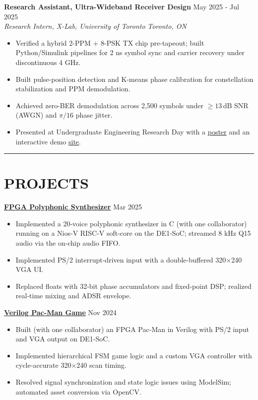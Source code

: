 \documentclass[letterpaper,10pt]{article}
\begin{document}
\vspace{0.2cm}
\noindent
\textbf{Research Assistant, Ultra-Wideband Receiver Design} \hfill May 2025 - Jul 2025\\
\textit{Research Intern, X-Lab, University of Toronto} \hfill \textit{Toronto, ON}
\begin{itemize}[leftmargin=0.2in]
    \item Verified a hybrid 2-PPM + 8-PSK TX chip pre-tapeout; built Python/Simulink pipelines for 2 ns symbol sync and carrier recovery under discontinuous 4 GHz.
	\item Built pulse-position detection and K-means phase calibration for constellation stabilization and PPM demodulation.
    \item Achieved zero-BER demodulation across 2,500 symbols under $\geq 13\,\mathrm{dB}$ SNR (AWGN) and $\pi/16$ phase jitter.
    \item Presented at Undergraduate Engineering Research Day with a \href{https://docs.google.com/presentation/d/1h4lmc_HQLzNvtGE4oE1jedOlNVZjL3iztEyGKnC-ico/edit?usp=sharing}{\uline{poster}} and an interactive demo \href{https://github.com/Ken-2511/ppm-psk-visualize}{\uline{site}}.
\end{itemize}

\noindent\rule{\linewidth}{1pt}

\section*{\textbf{PROJECTS}}

\noindent\href{https://github.com/alexzjm/ece243-sound-synthesizer}{\uline{
\textbf{FPGA Polyphonic Synthesizer}}} \hfill Mar 2025
\begin{itemize}[leftmargin=0.2in]
	\item Implemented a 20‑voice polyphonic synthesizer in C (with one collaborator) running on a Nios‑V RISC‑V soft‑core on the DE1‑SoC; streamed 8 kHz Q15 audio via the on‑chip audio FIFO.
    \item Implemented PS/2 interrupt‑driven input with a double‑buffered 320×240 VGA UI.
    \item Replaced floats with 32‑bit phase accumulators and fixed‑point DSP; realized real‑time mixing and ADSR envelope.
\end{itemize}

\vspace{0.2cm}
\noindent\href{https://github.com/Ken-2511/ECE241-Project}{\uline{
\textbf{Verilog Pac-Man Game}}} \hfill Nov 2024
\begin{itemize}[leftmargin=0.2in]
    \item Built (with one collaborator) an FPGA Pac‑Man in Verilog with PS/2 input and VGA output on DE1-SoC.
    \item Implemented hierarchical FSM game logic and a custom VGA controller with cycle‑accurate 320×240 scan timing.
    \item Resolved signal synchronization and state logic issues using ModelSim; automated asset conversion via OpenCV.
\end{itemize}
\end{document}
